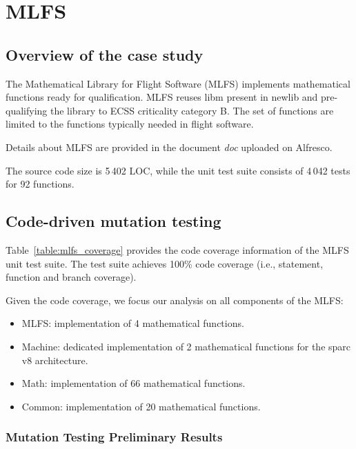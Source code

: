 \clearpage

\section{MLFS}
\label{sec:caseStudies:GSL:MLSF}

\subsection{Overview of the case study}

The Mathematical Library for Flight Software (MLFS) implements mathematical functions ready for qualification. MLFS reuses libm present in newlib and pre-qualifying the library to ECSS criticality category B. The set of functions are limited to the functions typically needed in flight software. 

Details about MLFS are provided in the document \emph{doc} uploaded on Alfresco.

The source code size is 5\,402 LOC, while the unit test suite consists of 4\,042 tests for 92 functions.

\subsection{Code-driven mutation testing}



Table~\ref{table:mlfs_coverage} provides the code coverage information of the MLFS unit test suite. The test suite achieves 100\% code coverage (i.e., statement, function and branch coverage).

Given the code coverage, we focus our analysis on all components of the MLFS:

\begin{itemize}
	\item MLFS: implementation of 4 mathematical functions.
	\item Machine: dedicated implementation of 2 mathematical functions for the sparc v8 architecture.
	\item Math: implementation of 66 mathematical functions.
	\item Common: implementation of 20 mathematical functions.
\end{itemize}

\subsubsection{Mutation Testing Preliminary Results}

